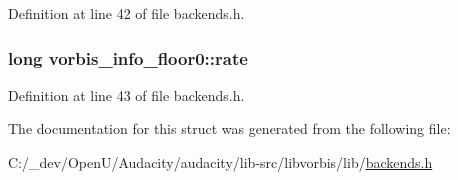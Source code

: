 Definition at line 42 of file backends.\+h.

\subsubsection[{\texorpdfstring{rate}{rate}}]{\setlength{\rightskip}{0pt plus 5cm}long vorbis\+\_\+info\+\_\+floor0\+::rate}\hypertarget{structvorbis__info__floor0_aec574189f1a7b44076c006e60f033160}{}\label{structvorbis__info__floor0_aec574189f1a7b44076c006e60f033160}


Definition at line 43 of file backends.\+h.



The documentation for this struct was generated from the following file\+:\begin{DoxyCompactItemize}
\item 
C\+:/\+\_\+dev/\+Open\+U/\+Audacity/audacity/lib-\/src/libvorbis/lib/\hyperlink{backends_8h}{backends.\+h}\end{DoxyCompactItemize}
